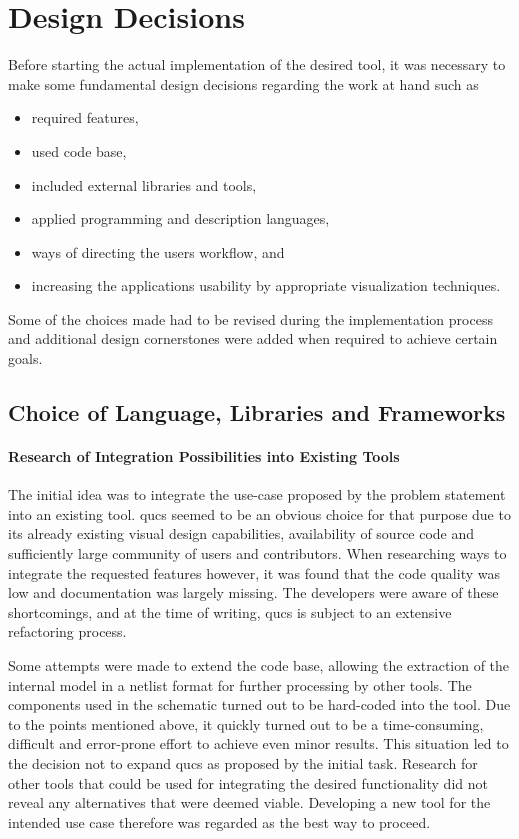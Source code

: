 \section{Design Decisions}
	Before starting the actual implementation of the desired tool, it was necessary to make some fundamental design decisions regarding the work at hand such as
	\begin{itemize}
	\item required features,
	\item used code base,
	\item included external libraries and tools,
	\item applied programming and description languages,
	\item ways of directing the users workflow, and
	\item increasing the applications usability by appropriate visualization techniques.
	\end{itemize}
	
	Some of the choices made had to be revised during the implementation process and additional design cornerstones were added when required to achieve certain goals. 
	
	
\subsection{Choice of Language, Libraries and Frameworks}
	\label{sec-languages-frameworks}
	
	\paragraph{Research of Integration Possibilities into Existing Tools}
		The initial idea was to integrate the use-case proposed by the problem statement into an existing tool.
		\Gls{qucs}\cite{Qucs:base} seemed to be an obvious choice for that purpose due to its already existing visual design capabilities, availability of source code and sufficiently large community of users and contributors.
		When researching ways to integrate the requested features however, it was found that the code quality was low and documentation was largely missing.
		The developers were aware of these shortcomings, and at the time of writing, \gls{qucs} is subject to an extensive refactoring process.
	
		Some attempts were made to extend the code base, allowing the extraction of the internal model in a netlist format for further processing by other tools. 
		The components used in the schematic turned out to be hard-coded into the tool.
		Due to the points mentioned above, it quickly turned out to be a time-consuming, difficult and error-prone effort to achieve even minor results.
		This situation led to the decision not to expand \gls{qucs} as proposed by the initial task.
		Research for other tools that could be used for integrating the desired functionality did not reveal any alternatives that were deemed viable.
		Developing a new tool for the intended use case therefore was regarded as the best way to proceed.
		
